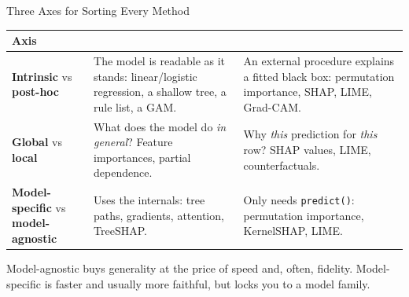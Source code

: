 \begin{frame}{Three Axes for Sorting Every Method}

    \centering
    \small
    \begin{tabular}{p{2.9cm} p{4.4cm} p{4.4cm}}
        \toprule
        \textbf{Axis} & & \\
        \midrule
        \textbf{Intrinsic} vs \textbf{post-hoc}
        & The model is readable as it stands: linear/logistic regression, a shallow tree, a
          rule list, a GAM.
        & An external procedure explains a fitted black box: permutation importance, SHAP, LIME,
          Grad-CAM. \\
        \addlinespace
        \textbf{Global} vs \textbf{local}
        & What does the model do \emph{in general}? Feature importances, partial dependence.
        & Why \emph{this} prediction for \emph{this} row? SHAP values, LIME, counterfactuals. \\
        \addlinespace
        \textbf{Model-specific} vs \textbf{model-agnostic}
        & Uses the internals: tree paths, gradients, attention, TreeSHAP.
        & Only needs \texttt{predict()}: permutation importance, KernelSHAP, LIME. \\
        \bottomrule
    \end{tabular}

    \vspace{1.1em}

    \raggedright
    \begin{block}{}
        \centering
        \small Model-agnostic buys generality at the price of speed and, often, fidelity.
        Model-specific is faster and usually more faithful, but locks you to a model family.
    \end{block}
\end{frame}

